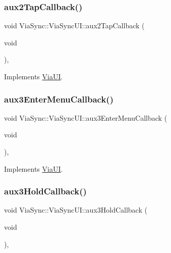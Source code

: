 \subsubsection{\texorpdfstring{aux2\+Tap\+Callback()}{aux2TapCallback()}}
{\footnotesize\ttfamily void Via\+Sync\+::\+Via\+Sync\+U\+I\+::aux2\+Tap\+Callback (\begin{DoxyParamCaption}\item[{void}]{ }\end{DoxyParamCaption})\hspace{0.3cm}{\ttfamily [override]}, {\ttfamily [virtual]}}



Implements \mbox{\hyperlink{class_via_u_i_ae5e009dc22002f62e6bff8dd76d2f745}{Via\+UI}}.

\mbox{\label{class_via_sync_1_1_via_sync_u_i_a66f7a9ccbfff3b1b1ba32fe775808703}} 
\subsubsection{\texorpdfstring{aux3\+Enter\+Menu\+Callback()}{aux3EnterMenuCallback()}}
{\footnotesize\ttfamily void Via\+Sync\+::\+Via\+Sync\+U\+I\+::aux3\+Enter\+Menu\+Callback (\begin{DoxyParamCaption}\item[{void}]{ }\end{DoxyParamCaption})\hspace{0.3cm}{\ttfamily [override]}, {\ttfamily [virtual]}}



Implements \mbox{\hyperlink{class_via_u_i_aa62c9f8dc58d37fc2a3abc7bce1cd16e}{Via\+UI}}.

\mbox{\label{class_via_sync_1_1_via_sync_u_i_ae35a16d1e3a6158ffd306b06e93b16a4}} 
\subsubsection{\texorpdfstring{aux3\+Hold\+Callback()}{aux3HoldCallback()}}
{\footnotesize\ttfamily void Via\+Sync\+::\+Via\+Sync\+U\+I\+::aux3\+Hold\+Callback (\begin{DoxyParamCaption}\item[{void}]{ }\end{DoxyParamCaption})\hspace{0.3cm}{\ttfamily [override]}, {\ttfamily [virtual]}}




